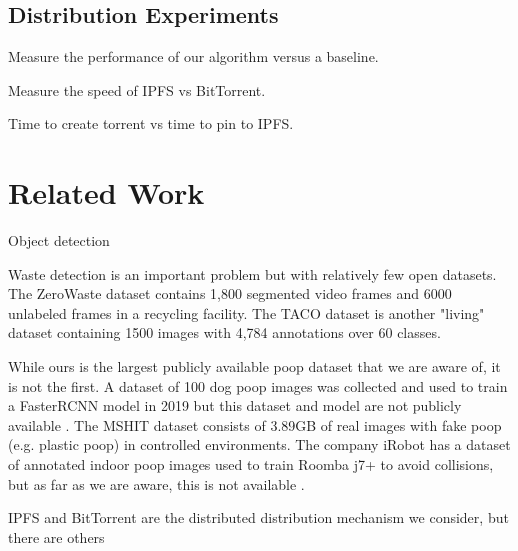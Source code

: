 \documentclass[10pt,twocolumn,letterpaper]{article}
\begin{document}
\subsection{Distribution Experiments}

Measure the performance of our algorithm versus a baseline.

Measure the speed of IPFS vs BitTorrent.

Time to create torrent vs time to pin to IPFS.

\section{Related Work}

Object detection

Waste detection is an important problem but with relatively few open datasets.
The ZeroWaste dataset \cite{bashkirova_zerowaste_2022} contains 1,800 segmented
video frames and 6000 unlabeled frames in a recycling facility.
The TACO dataset \cite{proenca_taco_2020} is another "living" dataset
containing 1500 images with 4,784 annotations over 60 classes.


While ours is the largest publicly available poop dataset that we are aware of,
it is not the first.
A dataset of 100 dog poop images was collected and used to train a FasterRCNN
model in 2019 but this dataset and model are not publicly available \cite{neeraj_madan_dog_2019}.
The MSHIT dataset \cite{mshit_2020} consists of 3.89GB of real images with fake
poop (e.g. plastic poop) in controlled environments.
The company iRobot has a dataset of annotated indoor poop images used to train
Roomba j7+ to avoid collisions, but as far as we are aware, this is not
available \cite{roomba_2021}.


IPFS and BitTorrent are the distributed distribution mechanism we consider, but there are others

\end{document}
